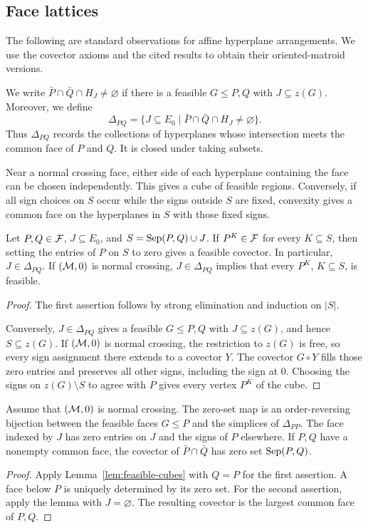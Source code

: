 \subsection{Face lattices} The following are standard observations for affine hyperplane
arrangements. We use the covector axioms and the cited results to
obtain their oriented-matroid versions.

We write
$\bar P\cap\bar Q\cap H_J\ne\varnothing$ if there is a
feasible $G\leq P,Q$ with $J\subseteq z(G)$. Moreover, we define
\[
 \Delta_{PQ}=\{J\subseteq E_0\mid\bar P\cap\bar Q\cap H_J\ne\varnothing\}.
\]
Thus $\Delta_{PQ}$ records the collections of hyperplanes whose
intersection meets the common face of $P$ and $Q$.
It is closed under taking subsets.


Near a normal crossing face, either side of each hyperplane containing
the face can be chosen independently. This gives a cube of feasible
regions. Conversely, if all sign choices on $S$ occur while the signs
outside $S$ are fixed, convexity gives a common face on the hyperplanes
in $S$ with those fixed signs.

\begin{lemma}\label{lem:feasible-cubes}
Let $P,Q\in\mathcal F$, $J\subseteq E_0$, and $S=\operatorname{Sep}(P,Q)\cup J$.
If $P^K\in\mathcal F$ for every $K\subseteq S$, then setting the entries of
$P$ on $S$ to zero gives a feasible covector. In particular,
$J\in\Delta_{PQ}$.
If $(\mathcal M,0)$ is normal crossing, $J\in\Delta_{PQ}$ implies that every
$P^K$, $K\subseteq S$, is feasible.
\end{lemma}
\begin{proof}
The first assertion follows by strong elimination and induction on $|S|$.

Conversely, $J\in\Delta_{PQ}$ gives a feasible $G\leq P,Q$ with
$J\subseteq z(G)$, and hence $S\subseteq z(G)$. If $(\mathcal M,0)$ is normal
crossing, the restriction to $z(G)$ is free, so every sign assignment there
extends to a covector $Y$. The covector $G\circ Y$ fills those zero
entries and preserves all other signs, including the sign at $0$.
Choosing the signs on $z(G)\setminus S$ to agree with $P$ gives every
vertex $P^K$ of the cube.
\end{proof}

\begin{corollary}\label{cor:face-subsets}
Assume that $(\mathcal M,0)$ is normal crossing. The zero-set map is an order-reversing
bijection between the feasible faces $G\leq P$ and the simplices of
$\Delta_{PP}$. The face indexed by $J$ has zero entries on $J$ and
the signs of $P$ elsewhere. If $P,Q$ have a nonempty common face,
the covector of $\bar P\cap\bar Q$ has zero set $\operatorname{Sep}(P,Q)$.
\end{corollary}
\begin{proof}
Apply Lemma~\ref{lem:feasible-cubes} with $Q=P$ for the first
assertion. A face below $P$ is uniquely determined by its zero set.
For the second assertion, apply the lemma with $J=\varnothing$.
The resulting covector is the largest common face of $P,Q$.
\end{proof}

